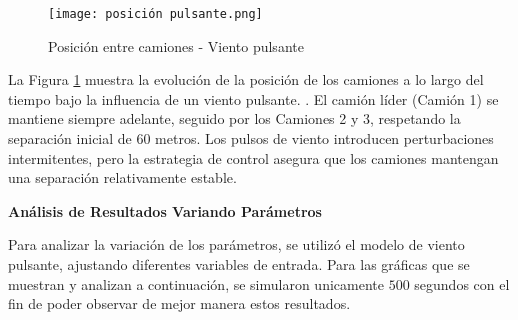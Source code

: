 \documentclass[11pt,stdletter,orderfromtodate,sigleft,twoside]{report}
\begin{document}
\begin{figure}[H]
    \centering
    \texttt{[image: posición pulsante.png]}
    \caption{Posición entre camiones - Viento pulsante}
    \label{figposfdasdf}
\end{figure}

La Figura \ref{figposfdasdf} muestra la evolución de la posición de los camiones a lo largo del tiempo bajo la influencia de un viento pulsante. . El camión líder (Camión 1) se mantiene siempre adelante, seguido por los Camiones 2 y 3, respetando la separación inicial de 60 metros. Los pulsos de viento introducen perturbaciones intermitentes, pero la estrategia de control asegura que los camiones mantengan una separación relativamente estable.



\textbf{Análisis de Resultados Variando Parámetros}


Para analizar la variación de los parámetros, se utilizó el modelo de viento pulsante, ajustando diferentes variables de entrada. Para las gráficas que se muestran y analizan a continuación, se simularon unicamente $500$ segundos con el fin de poder observar de mejor manera estos resultados.
\end{document}
